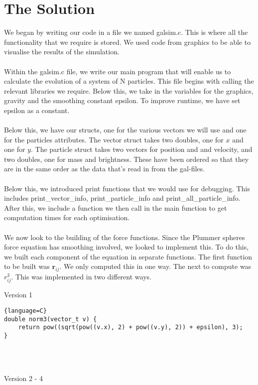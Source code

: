 \documentclass[12pt]{article}
\begin{document}
\section{The Solution}
We began by writing our code in a file we named galsim.c. This is where all the functionality that we require is stored. We used code from graphics to be able to visualise the results of the simulation.
\\\\
Within the galsim.c file, we write our main program that will enable us to calculate the evolution of a system of N particles. This file begins with calling the relevant libraries we require. Below this, we take in the variables for the graphics, gravity and the smoothing constant epsilon. To improve runtime, we have set epsilon as a constant.
\\\\
Below this, we have our structs, one for the various vectors we will use and one for the particles attributes. The vector struct takes two doubles, one for $x$ and one for $y$. The particle struct takes two vectors for position and and velocity, and two doubles, one for mass and brightness. These have been ordered so that they are in the same order as the data that's read in from the gal-files.
\\\\
Below this, we introduced print functions that we would use for debugging. This includes print\_vector\_info, print\_particle\_info and print\_all\_particle\_info. After this, we include a function we then call in the main function to get computation times for each optimisation.
\\\\
We now look to the building of the force functions. Since the Plummer spheres force equation has smoothing involved, we looked to implement this. To do this, we built each component of the equation in separate functions. The first function to be built was $\boldsymbol{r}_{ij}$. We only computed this in one way. The next to compute was $r_{ij}^{3}$. This was implemented in two different ways.
\begin{center}
    Version 1
\end{center}
\begin{lstlisting}{language=C}
double norm3(vector_t v) {
    return pow((sqrt(pow((v.x), 2) + pow((v.y), 2)) + epsilon), 3);
}
\end{lstlisting}
\\\\
\begin{center}
    Version 2 - 4
\end{center}
\end{document}
